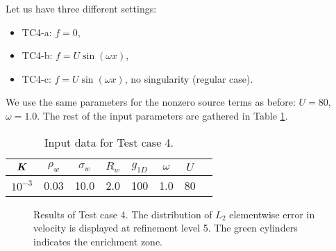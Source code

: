 Let us have three different settings: 
\begin{itemize}
    \item TC4-a: $f=0$,
    \item TC4-b: $f=U\sin(\omega x)$,
    \item TC4-c: $f=U\sin(\omega x)$, no singularity (regular case).
\end{itemize}
We use the same parameters for the nonzero source terms as before: $U=80$, $\omega=1.0$.
The rest of the input parameters are gathered in Table \ref{tab:tc4_data}.
%
\begin{table}[!htb]
\begin{center}
\begin{tabular}{cccccccc}
\toprule
$\mathbf{\boldsymbol{K}}$ & $\rho_w$ & $\sigma_w$ & $R_w$ & $g_{1D}$ & $\omega$ & $U$ \\
\midrule
$10^{-3}$ & 0.03 & 10.0 & 2.0 & 100 & 1.0 & 80\\
\bottomrule
\end{tabular}
\caption{Input data for Test case 4.}
\label{tab:tc4_data}
\end{center}
\end{table}
%
\begin{figure}[!htb]
    \centering
    \caption
    {Results of Test case 4. The distribution of $L_2$ elementwise error in velocity is displayed at refinement level 5.
    The green cylinders indicates the enrichment zone. }
    \label{fig:mh_tc4_error}
\end{figure}

